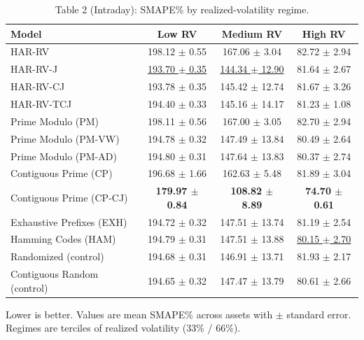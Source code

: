 \begin{table}[t]
\centering
\caption{Table 2 (Intraday): SMAPE\% by realized-volatility regime.}
\label{tab:regimes_intraday}
\begin{tabular}{lccc}
\toprule
Model & Low RV & Medium RV & High RV \\
\midrule
 HAR-RV & 198.12 $\pm$ 0.55 & 167.06 $\pm$ 3.04 & 82.72 $\pm$ 2.94 \\
 HAR-RV-J & \underline{193.70 $\pm$ 0.35} & \underline{144.34 $\pm$ 12.90} & 81.64 $\pm$ 2.67 \\
 HAR-RV-CJ & 193.78 $\pm$ 0.35 & 145.42 $\pm$ 12.74 & 81.67 $\pm$ 3.26 \\
 HAR-RV-TCJ & 194.40 $\pm$ 0.33 & 145.16 $\pm$ 14.17 & 81.23 $\pm$ 1.08 \\
 Prime Modulo (PM) & 198.11 $\pm$ 0.56 & 167.00 $\pm$ 3.05 & 82.70 $\pm$ 2.94 \\
 Prime Modulo (PM-VW) & 194.78 $\pm$ 0.32 & 147.49 $\pm$ 13.84 & 80.49 $\pm$ 2.64 \\
 Prime Modulo (PM-AD) & 194.80 $\pm$ 0.31 & 147.64 $\pm$ 13.83 & 80.37 $\pm$ 2.74 \\
 Contiguous Prime (CP) & 196.68 $\pm$ 1.66 & 162.63 $\pm$ 5.48 & 81.89 $\pm$ 3.04 \\
 Contiguous Prime (CP-CJ) & \textbf{179.97 $\pm$ 0.84} & \textbf{108.82 $\pm$ 8.89} & \textbf{74.70 $\pm$ 0.61} \\
 Exhaustive Prefixes (EXH) & 194.72 $\pm$ 0.32 & 147.51 $\pm$ 13.74 & 81.19 $\pm$ 2.54 \\
 Hamming Codes (HAM) & 194.79 $\pm$ 0.31 & 147.51 $\pm$ 13.88 & \underline{80.15 $\pm$ 2.70} \\
 Randomized (control) & 194.68 $\pm$ 0.31 & 146.91 $\pm$ 13.71 & 81.93 $\pm$ 2.17 \\
 Contiguous Random (control) & 194.65 $\pm$ 0.32 & 147.47 $\pm$ 13.79 & 80.61 $\pm$ 2.66 \\
\bottomrule
\end{tabular}
\vspace{2pt}\par\footnotesize Lower is better. Values are mean SMAPE\% across assets with $\pm$ standard error. Regimes are terciles of realized volatility (33\% / 66\%).
\end{table}